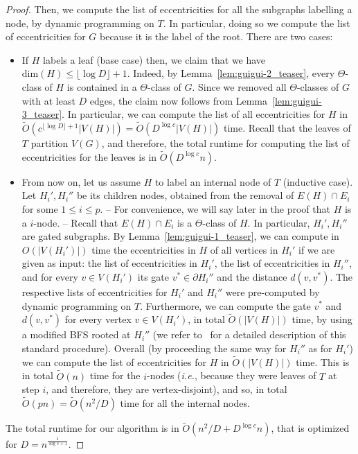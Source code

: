 \documentclass[a4paper,UKenglish,numberwithinsect,cleveref, autoref,anonymous]{lipics-v2021}
\begin{document}
\begin{proof}
Then, we compute the list of eccentricities for all the subgraphs labelling a node, by dynamic programming on $T$. 
In particular, doing so we compute the list of eccentricities for $G$ because it is the label of the root.
There are two cases:
\begin{itemize}
    \item If $H$ labels a leaf (base case) then, we claim that we have $\mbox{dim}(H) \leq \lfloor \log{D} \rfloor + 1$.
Indeed, by Lemma~\ref{lem:guigui-2_teaser}, every $\Theta$-class of $H$ is contained in a $\Theta$-class of $G$.
Since we removed all $\Theta$-classes of $G$ with at least $D$ edges, the claim now follows from Lemma~\ref{lem:guigui-3_teaser}.
In particular, we can compute the list of all eccentricities for $H$ in $\tilde{O}(c^{\lfloor \log{D} \rfloor + 1}|V(H)|) = \tilde{O}(D^{\log{c}}|V(H)|)$ time.
Recall that the leaves of $T$ partition $V(G)$, and therefore, the total runtime for computing the list of eccentricities for the leaves is in $\tilde{O}(D^{\log{c}}n)$.
    \item From now on, let us assume $H$ to label an internal node of $T$ (inductive case).
Let $H_i',H_i''$ be its children nodes, obtained from the removal of $E(H) \cap E_i$ for some $1 \leq i \leq p$.
-- For convenience, we will say later in the proof that $H$ is a $i$-node. --
Recall that $E(H) \cap E_i$ is a $\Theta$-class of $H$.
In particular, $H_i',H_i''$ are gated subgraphs.
By Lemma~\ref{lem:guigui-1_teaser}, we can compute in ${O}(|V(H_i')|)$ time the eccentricities in $H$ of all vertices in $H_i'$ if we are given as input: the list of eccentricities in $H_i'$, the list of eccentricities in $H_i''$, and for every $v \in V(H_i')$ its gate $v^* \in \partial H_i''$ and the distance $d(v,v^*)$. 
The respective lists of eccentricities for $H_i'$ and $H_i''$ were pre-computed by dynamic programming on $T$.
Furthermore, we can compute the gate $v^*$ and $d(v,v^*)$ for every vertex $v \in V(H_i')$, in total $\tilde{O}(|V(H)|)$ time, by using a modified BFS rooted at $H_i''$ (we refer to~\cite[Lemma 17]{ChLaRa19} for a detailed description of this standard procedure).
Overall (by proceeding the same way for $H_i''$ as for $H_i'$) we can compute the list of eccentricities for $H$ in $\tilde{O}(|V(H)|)$ time.
This is in total $\tilde{O}(n)$ time for the $i$-nodes ({\it i.e.}, because they were leaves of $T$ at step $i$, and therefore, they are vertex-disjoint), and so, in total $\tilde{O}(pn) = \tilde{ O}(n^2/D)$ time for all the internal nodes.
\end{itemize}
The total runtime for our algorithm is in $\tilde{O}(n^2/D + D^{\log{c}}n)$, that is optimized for $D = n^{\frac 1 {\log{c}+1}}$.
\end{proof}
\end{document}

